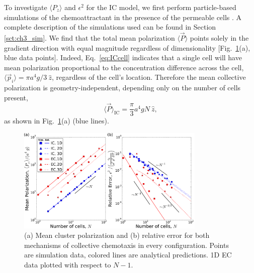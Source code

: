 To investigate $\langle P_z\rangle$ and $\epsilon^2$ for the IC model,
we first perform particle-based simulations of the chemoattractant in the presence of the permeable cells \cite{ch3code}. A complete description of the simulations used can be found in Section \ref{sct:ch3_sim}. We find that the total mean polarization $\langle \vec{P} \rangle$ points solely in the gradient direction with equal magnitude regardless of dimensionality [Fig.\ \ref{fig:ch3_2}(a), blue data points]. Indeed, Eq.\ \ref{eq:ICcell} indicates that a single cell will have mean polarization proportional to the concentration difference across the cell,
$\langle \vec{p}_i \rangle = \pi a^4g/3 \ \hat{z}$,
regardless of the cell's location.
Therefore the mean collective polarization is geometry-independent, depending only on the number of cells present,
\begin{equation} \label{eq:ICmean}
    \langle \vec{P} \rangle_\text{IC} = \frac{\pi}{3} a^4gN \ \hat{z},
\end{equation}
as shown in Fig.\ \ref{fig:ch3_2}(a) (blue lines).

\begin{figure}[ht]
    \centering
        \includegraphics[width=0.8\textwidth]{../fig/ch3_fig2.pdf}
    \caption{(a) Mean cluster polarization and (b) relative error for both mechanisms of collective chemotaxis in every configuration. Points are simulation data, colored lines are analytical predictions. 1D EC data plotted with respect to $N-1$.} \label{fig:ch3_2}
\end{figure}

